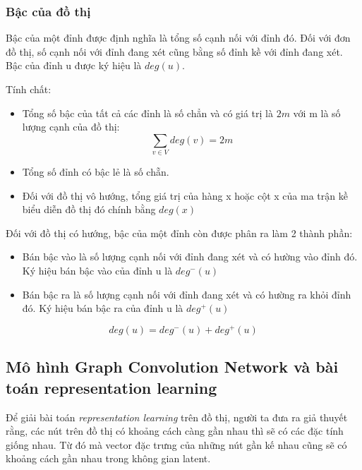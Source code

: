 \subsubsection{Bậc của đồ thị}

Bậc của một đỉnh được định nghĩa là tổng số cạnh nối với đỉnh đó. Đối với đơn đồ thị, số cạnh nối với đỉnh đang xét cũng bằng số đỉnh kề với đỉnh đang xét. Bậc của đỉnh u được ký hiệu là $deg(u)$.

Tính chất:
\begin{itemize}
	\item Tổng số bậc của tất cả các đỉnh là số chẳn và có giá trị là $2m$ với m là số lượng cạnh của đồ thị:
	\begin{equation*}
		\sum_{v \in V}{deg(v)} = 2m
	\end{equation*}
	\item Tổng số đỉnh có bậc lẻ là số chẵn.
	\item Đối với đồ thị vô hướng, tổng giá trị của hàng x hoặc cột x của ma trận kề biểu diễn đồ thị đó chính bằng $deg(x)$
\end{itemize}

Đối với đồ thị có hướng, bậc của một đỉnh còn được phân ra làm 2 thành phần:
\begin{itemize}
	\item Bán bậc vào là số lượng cạnh nối với đỉnh đang xét và có hường vào đỉnh đó. Ký hiệu bán bậc vào của đỉnh u là $deg^-(u)$
	\item Bán bậc ra là số lượng cạnh nối với đỉnh đang xét và có hường ra khỏi đỉnh đó. Ký hiệu bán bậc ra của đỉnh u là $deg^+(u)$
\end{itemize}

\begin{equation*}
	deg(u) = deg^-(u) + deg^+(u)
\end{equation*}

\subsection{Mô hình Graph Convolution Network và bài toán representation learning}

Để giải bài toán \textit{representation learning} trên đồ thị, người ta đưa ra giả thuyết rằng, các nút trên đồ thị có khoảng cách càng gần nhau thì sẽ có các đặc tính giống nhau. Từ đó mà vector đặc trưng của những nút gần kế nhau cũng sẽ có khoảng cách gần nhau trong không gian latent.

